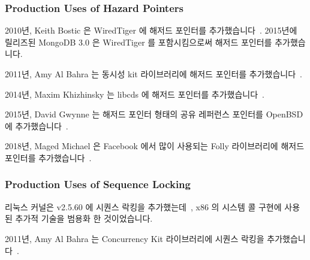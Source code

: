 \subsubsection{Production Uses of Hazard Pointers}
\label{sec:defer:Production Uses of Hazard Pointers}

2010년, Keith Bostic 은 WiredTiger 에 해저드 포인터를
추가했습니다~\cite{KeithBostic2010WiredTigerhazptr}.
2015년에 릴리즈된 MongoDB 3.0 은 WiredTiger 를 포함시킴으로써 해저드 포인터를
추가했습니다.

2011년, Amy Al Bahra 는 동시성 kit 라이브러리에 해저드 포인터를
추가했습니다~\cite{SamyAlBahra2011ckhp}.
\iffalse

In 2010, Keith Bostic added hazard pointers to
WiredTiger~\cite{KeithBostic2010WiredTigerhazptr}.
MongoDB 3.0, released in 2015, included WiredTiger and thus hazard pointers.

In 2011, Samy Al Bahra added hazard pointers to the Concurrency Kit
library~\cite{SamyAlBahra2011ckhp}.
\fi

2014년, Maxim Khizhinsky 는 libcds 에 해저드 포인터를
추가했습니다~\cite{MaximKhizhinsky2014libcdsHazptr}.

2015년, David Gwynne 는 해저드 포인터 형태의 공유 레퍼런스 포인터를 OpenBSD 에
추가했습니다~\cite{DavidGwynne2015srp}.

2018년, Maged Michael 은 Facebook 에서 많이 사용되는 Folly 라이브러리에 해저드
포인터를 추가했습니다~\cite{MagedMichael2018FollyHazptr}.
\iffalse

In 2014, Maxim Khizhinsky added hazard pointers to
libcds~\cite{MaximKhizhinsky2014libcdsHazptr}.

In 2015, David Gwynne introduced shared reference pointers, a form
of hazard pointers, to OpenBSD~\cite{DavidGwynne2015srp}.

In 2018, Maged Michael added hazard pointers to Facebook's Folly
library~\cite{MagedMichael2018FollyHazptr}, where it is used heavily.
\fi

\subsubsection{Production Uses of Sequence Locking}
\label{sec:defer:Production Uses of Sequence Locking}

리눅스 커널은 v2.5.60 에 시퀀스 락킹을
추가했는데~\cite{JonathanCorbet2003seqlock}, x86 의  시스템
콜 구현에 사용된 추가적 기술을 범용화 한 것이었습니다.

2011년, Amy Al Bahra 는 Concurrency Kit 라이브러리에 시퀀스 락킹을
추가했습니다~\cite{SamyAlBahra2011ckseqlock}.
\iffalse

